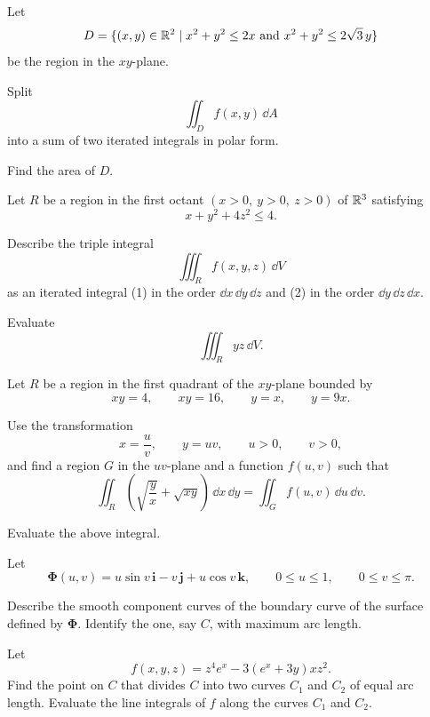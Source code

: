 \begin{problem}
Let
\[
D=\{(x, y)\in\mathbb{R}^2\mid x^2+y^2\le2x\text{ and }x^2+y^2\le2\sqrt3\,y\}
\]
be the region in the $xy$-plane.
\begin{problemsubparts}
\item Split
\[
\iint_D f(x, y)\,\dd A
\]
into a sum of two iterated integrals in polar form.
\item Find the area of $D$.
\end{problemsubparts}
\end{problem}

\begin{problem}
Let $R$ be a region in the first octant $(x>0, \ y>0, \ z>0)$ of $\mathbb{R}^3$ satisfying
\[
x+y^2+4z^2\le4.
\]
\begin{problemsubparts}
\item Describe the triple integral
\[
\iiint_R f(x, y, z)\,\dd V
\]
as an iterated integral (1) in the order $\dd x\,\dd y\,\dd z$ and (2) in the order $\dd y\,\dd z\,\dd x$.
\item Evaluate
\[
\iiint_R yz\,\dd V.
\]
\end{problemsubparts}
\end{problem}

\begin{problem}
Let $R$ be a region in the first quadrant of the $xy$-plane bounded by
\[
xy=4,
\qquad
xy=16,
\qquad
y=x,
\qquad
y=9x.
\]
\begin{problemsubparts}
\item Use the transformation
\[
x=\frac{u}{v},
\qquad
y=uv,
\qquad u>0,
\qquad v>0,
\]
and find a region $G$ in the $uv$-plane and a function $f(u, v)$ such that
\[
\iint_R\left(\sqrt{\frac{y}{x}}+\sqrt{xy}\right)\,\dd x\,\dd y
=
\iint_G f(u, v)\,\dd u\,\dd v.
\]
\item Evaluate the above integral.
\end{problemsubparts}
\end{problem}

\begin{problem}
Let
\[
\boldsymbol{\Phi}(u, v)
=u\sin v\,\mathbf i-v\,\mathbf j+u\cos v\,\mathbf k,
\qquad
0\le u\le1,
\qquad
0\le v\le\pi.
\]
\begin{problemsubparts}
\item Describe the smooth component curves of the boundary curve of the surface defined by $\boldsymbol{\Phi}$. Identify the one, say $C$, with maximum arc length.
\item Let
\[
f(x, y, z)=z^4e^x-3(e^x+3y)xz^2.
\]
Find the point on $C$ that divides $C$ into two curves $C_1$ and $C_2$ of equal arc length. Evaluate the line integrals of $f$ along the curves $C_1$ and $C_2$.
\end{problemsubparts}
\end{problem}

